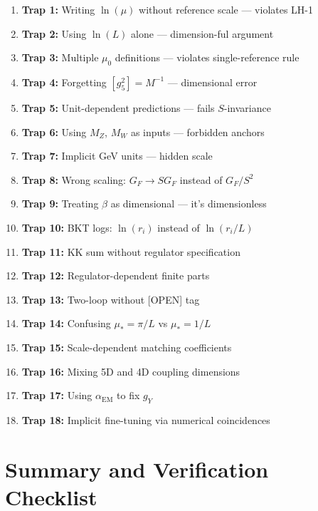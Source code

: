 \documentclass[11pt,a4paper]{article}
\theoremstyle{definition}
\begin{document}
\begin{enumerate}
\item \textbf{Trap 1:} Writing $\ln(\mu)$ without reference scale — violates LH-1
\item \textbf{Trap 2:} Using $\ln(L)$ alone — dimension-ful argument
\item \textbf{Trap 3:} Multiple $\mu_0$ definitions — violates single-reference rule
\item \textbf{Trap 4:} Forgetting $[g_5^2] = M^{-1}$ — dimensional error
\item \textbf{Trap 5:} Unit-dependent predictions — fails $S$-invariance
\item \textbf{Trap 6:} Using $M_Z$, $M_W$ as inputs — forbidden anchors
\item \textbf{Trap 7:} Implicit GeV units — hidden scale
\item \textbf{Trap 8:} Wrong scaling: $G_F \to S G_F$ instead of $G_F/S^2$
\item \textbf{Trap 9:} Treating $\beta$ as dimensional — it's dimensionless
\item \textbf{Trap 10:} BKT logs: $\ln(r_i)$ instead of $\ln(r_i/L)$
\item \textbf{Trap 11:} KK sum without regulator specification
\item \textbf{Trap 12:} Regulator-dependent finite parts
\item \textbf{Trap 13:} Two-loop without [OPEN] tag
\item \textbf{Trap 14:} Confusing $\mu_* = \pi/L$ vs $\mu_* = 1/L$
\item \textbf{Trap 15:} Scale-dependent matching coefficients
\item \textbf{Trap 16:} Mixing 5D and 4D coupling dimensions
\item \textbf{Trap 17:} Using $\alpha_{\text{EM}}$ to fix $g_Y$
\item \textbf{Trap 18:} Implicit fine-tuning via numerical coincidences
\end{enumerate}

\section{Summary and Verification Checklist}
\label{sec:summary}
\end{document}
